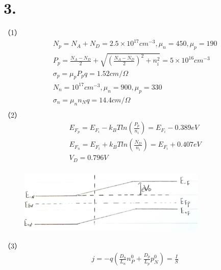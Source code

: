 \documentclass[UTF8]{ctexart}
\begin{document}
\section*{3.}
（1）
\begin{equation*}
    \begin{aligned}
        & N_p=N_A+N_D=2.5\times10^{17}cm^{-3},\mu_n=450, \mu_p=190\\
        & P_p=\frac{N_A-N_D}{2}+\sqrt{(\frac{N_A-N_D}{2})^2+n_i^2}=5\times10^{16}cm^{-3}\\
        & \sigma_p=\mu_pP_pq=1.52cm/\Omega\\
        & N_n = 10^{17}cm^{-3}, \mu_n=900, \mu_p=330\\
        & \sigma_n=\mu_nn_Nq=14.4cm/\Omega\\
    \end{aligned}
\end{equation*}
（2）
\begin{equation*}
    \begin{aligned}
        &E_{F_p}=E_{F_i}-k_BTln(\frac{P_p}{n_i})=E_{F_i}-0.389eV\\
        &E_{F_n}=E_{F_i}+k_BTln(\frac{N_D}{n_i})=E_{F_i}+0.407eV\\
        &V_D=0.796V\\
    \end{aligned}
\end{equation*}
\begin{figure}[H]                                         
    \centering                                                
    \includegraphics[width=9cm,height=3cm]{ans-3-2.jpg}        
    \caption*{}                                                                                   
\end{figure} 
（3）
\begin{equation*}
    \begin{aligned}
        & j=-q(\frac{D_n}{L_n}n_P^0+\frac{D_p}{L_p}p_N^0)=\frac{I}{S}\\
    \end{aligned}
\end{equation*}
\end{document}
